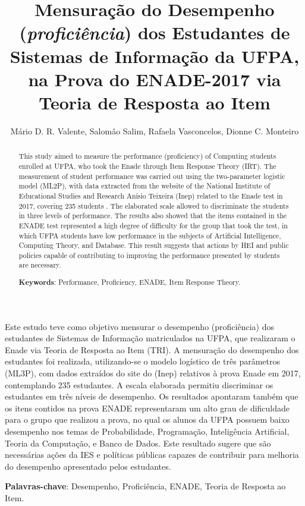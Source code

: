\documentclass[12pt]{article}
\title{Mensuração do Desempenho (\textit{proficiência}) dos Estudantes de Sistemas de Informação da UFPA, na Prova do ENADE-2017 via Teoria de Resposta ao Item}
\author{Mário D. R. Valente\inst{1}, Salomâo Salim\inst{1}, Rafaela Vasconcelos\inst{1}, Dionne C. Monteiro\inst{2} }
\begin{document}
 

\maketitle

\begin{abstract}
 This study aimed to measure the performance (proficiency) of Computing students enrolled at UFPA, who took the Enade through Item Response Theory (IRT). The measurement of student performance was carried out using the two-parameter logistic model (ML2P), with data extracted from the website of the National Institute of Educational Studies and Research Anísio Teixeira (Inep) related to the Enade test in 2017, covering 235 students . The elaborated scale allowed to discriminate the students in three levels of performance. The results also showed that the items contained in the ENADE test represented a high degree of difficulty for the group that took the test, in which UFPA students have low performance in the subjects of Artificial Intelligence, Computing Theory, and Database. This result suggests that actions by HEI and public policies capable of contributing to improving the performance presented by students are necessary.
  
\noindent
  \textbf{Keywords}: Performance, Proficiency, ENADE, Item Response Theory.
\end{abstract}

\begin{resumo} 
Este estudo teve como objetivo mensurar o desempenho (proficiência) dos estudantes de Sistemas de Informação matriculados na UFPA, que realizaram o Enade via Teoria de Resposta ao Item (TRI). A mensuração do desempenho dos estudantes foi realizada, utilizando-se o modelo logístico de três parâmetros (ML3P), com dados extraídos do site do (Inep) relativos à prova Enade em 2017, contemplando 235 estudantes. A escala elaborada permitiu discriminar os estudantes em três níveis de desempenho. Os resultados apontaram também que os itens contidos na prova ENADE representaram um alto grau de dificuldade para o grupo que realizou a prova, no qual os alunos da UFPA possuem baixo desempenho nos temas de Probabilidade, Programação, Inteligência Artificial, Teoria da Computação, e Banco de Dados. Este resultado sugere que são necessárias ações da IES e políticas públicas capazes de contribuir para melhoria do desempenho apresentado pelos estudantes.
  
\noindent
  \textbf{Palavras-chave}: Desempenho, Proficiência, ENADE, Teoria de Resposta ao Item.
\end{resumo}
\end{document}
